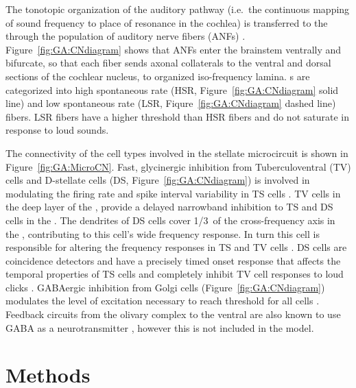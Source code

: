 \smallskip{} 

The tonotopic organization of the auditory pathway (i.e.\ the
continuous mapping of sound frequency to place of resonance in the
cochlea) is transferred to the {\CN} through the population of auditory
nerve fibers (ANFs)
\citep{Lorente:1981}. Figure~\ref{fig:GA:CNdiagram} shows that ANFs
enter the brainstem ventrally and bifurcate, so that each fiber sends
axonal collaterals to the ventral and dorsal sections of the cochlear
nucleus, to organized iso-frequency lamina. {\ANF}s are categorized into
high spontaneous rate (HSR, Figure~\ref{fig:GA:CNdiagram} solid line)
and low spontaneous rate (LSR, Fiqure~\ref{fig:GA:CNdiagram} dashed
line) fibers. LSR fibers have a higher threshold than HSR fibers and
do not saturate in response to loud sounds.

\smallskip{} 

The connectivity of the cell types involved in the stellate
microcircuit is shown in Figure~\ref{fig:GA:MicroCN}. Fast,
glycinergic inhibition from Tuberculoventral (TV) cells and D-stellate
cells (DS, Figure~\ref{fig:GA:CNdiagram}) is involved in modulating
the firing rate and spike interval variability in TS cells
\citep{FerragamoGoldingEtAl:1998,WickesbergOertel:1993}. TV cells in
the deep layer of the \DCN, provide a delayed narrowband
inhibition to TS and DS cells in the \VCN\@.  The dendrites of
DS cells cover 1/3~of the cross-frequency axis in the \CN, contributing
to this cell's wide frequency response. In turn this cell is
responsible for altering the frequency responses in TS and TV cells
\citep{SpirouDavisEtAl:1999}. DS cells are coincidence detectors and
have a precisely timed onset response that affects the temporal
properties of TS cells
\citep{PaoliniClareyEtAl:2005,RhodeGreenberg:1994a} and completely
inhibit TV cell responses to loud clicks
\citep{SpirouDavisEtAl:1999}. GABAergic inhibition from Golgi cells
(Figure~\ref{fig:GA:CNdiagram}) modulates the level of excitation
necessary to reach threshold for all {\CN} cells
\citep{CasparyBackoffEtAl:1994,FerragamoGoldingEtAl:1998}. Feedback
circuits from the olivary complex to the ventral {\CN} are also known to
use {GABA} as a neurotransmitter \citep{SaintMorestEtAl:1989}, however
this is not included in the model.

\smallskip{} 

\section{Methods}

